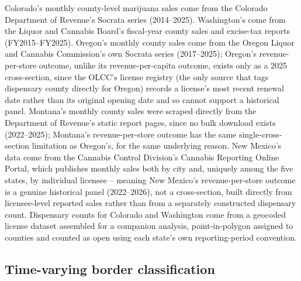\documentclass[12pt]{article}
\begin{document}
Colorado's monthly county-level marijuana sales come from the Colorado Department of Revenue's Socrata series
(2014--2025). Washington's come from the Liquor and Cannabis Board's fiscal-year county sales and excise-tax
reports (FY2015--FY2025). Oregon's monthly county sales come from the Oregon Liquor and Cannabis Commission's
own Socrata series (2017--2025); Oregon's revenue-per-store outcome, unlike its revenue-per-capita outcome,
exists only as a 2025 cross-section, since the OLCC's license registry (the only source that tags dispensary
county directly for Oregon) records a license's most recent renewal date rather than its original opening date
and so cannot support a historical panel. Montana's monthly county sales were scraped directly from the
Department of Revenue's static report pages, since no bulk download exists (2022--2025); Montana's
revenue-per-store outcome has the same single-cross-section limitation as Oregon's, for the same underlying
reason. New Mexico's data come from the Cannabis Control Division's Cannabis Reporting Online Portal, which
publishes monthly sales both by city and, uniquely among the five states, by individual licensee -- meaning
New Mexico's revenue-per-store outcome is a genuine historical panel (2022--2026), not a cross-section, built
directly from licensee-level reported sales rather than from a separately constructed dispensary count.
Dispensary counts for Colorado and Washington come from a geocoded license dataset assembled for a companion
analysis, point-in-polygon assigned to counties and counted as open using each state's own reporting-period
convention.

\subsection{Time-varying border classification}
\label{sec:timevarying}
\end{document}
